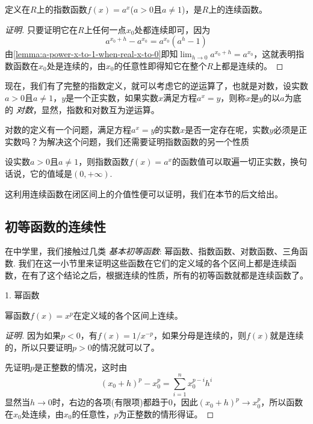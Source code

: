 \begin{theorem}
  定义在$R$上的指数函数$f(x)=a^x$($a>0$且$a \neq 1$)，是$R$上的连续函数。
\end{theorem}

\begin{proof}[证明]
  只要证明它在$R$上任何一点$x_0$处都连续即可，因为
  \[ a^{x_0+h} - a^{x_0} = a^{x_0}(a^h-1) \]
  由\autoref{lemma:a-power-x-to-1-when-real-x-to-0}即知$\lim_{h \to 0} a^{x_0+h} = a^{x_0}$，这就表明指数函数在$x_0$处是连续的，由$x_0$的任意性即得知它在整个$R$上都是连续的。
\end{proof}

现在，我们有了完整的指数定义，就可以考虑它的逆运算了，也就是对数，设实数$a>0$且$a \neq 1$，$y$是一个正实数，如果实数$x$满足方程$a^x=y$，则称$x$是$y$的以$a$为底的 \emph{对数}，显然，指数和对数互为逆运算。

对数的定义有一个问题，满足方程$a^x=y$的实数$x$是否一定存在呢，实数$y$必须是正实数吗？为解决这个问题，我们还需要证明指数函数的另一个性质
\begin{theorem}
  设实数$a>0$且$a \neq 1$，则指数函数$f(x)=a^x$的函数值可以取遍一切正实数，换句话说，它的值域是$(0,+\infty)$.
\end{theorem}

这利用连续函数在闭区间上的介值性便可以证明，我们在本节的后文给出。

\subsection{初等函数的连续性}
\label{sec:continuousness-of-elementary-function}


在中学里，我们接触过几类 \emph{基本初等函数}: 幂函数、指数函数、对数函数、三角函数. 我们在这一小节里来证明这些函数在它们的定义域的各个区间上都是连续函数，在有了这个结论之后，根据连续的性质，所有的初等函数就都是连续函数了。

1. 幂函数
\begin{theorem}
  幂函数$f(x)=x^p$在定义域的各个区间上连续。
\end{theorem}

\begin{proof}[证明]
  因为如果$p<0$，有$f(x)=1/x^{-p}$，如果分母是连续的，则$f(x)$就是连续的，所以只要证明$p>0$的情况就可以了。

  先证明$p$是正整数的情况，这时由
  \[ (x_0+h)^p-x_0^p = \sum_{i=1}^nx_0^{p-i}h^i \]
  显然当$h \to 0$时，右边的各项(有限项)都趋于0，因此$(x_0+h)^p \to x_0^p$，所以函数在$x_0$处连续，由$x_0$的任意性，$p$为正整数的情形得证。
\end{proof}

